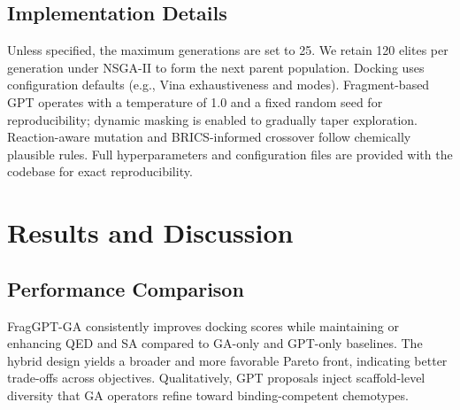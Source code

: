 \documentclass[lettersize,journal]{IEEEtran}
\begin{document}
\subsection{Implementation Details}
Unless specified, the maximum generations are set to 25. We retain 120 elites per generation under NSGA-II to form the next parent population. Docking uses configuration defaults (e.g., Vina exhaustiveness and modes). Fragment-based GPT operates with a temperature of 1.0 and a fixed random seed for reproducibility; dynamic masking is enabled to gradually taper exploration. Reaction-aware mutation and BRICS-informed crossover follow chemically plausible rules. Full hyperparameters and configuration files are provided with the codebase for exact reproducibility.


\section{Results and Discussion}
\subsection{Performance Comparison}
FragGPT-GA consistently improves docking scores while maintaining or enhancing QED and SA compared to GA-only and GPT-only baselines. The hybrid design yields a broader and more favorable Pareto front, indicating better trade-offs across objectives. Qualitatively, GPT proposals inject scaffold-level diversity that GA operators refine toward binding-competent chemotypes.
\end{document}
